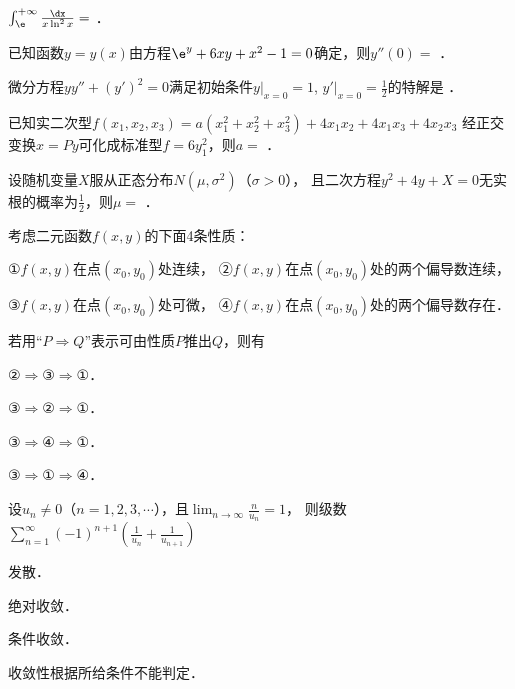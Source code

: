 \documentclass[plain,noanswer,medmath]{../../template/jnuexam}
\begin{document}




\begin{problem}
$\int_{\e}^{+\infty} \frac{\dx}{x\ln^2 x} =$ \fillin{}．
\end{problem}


\begin{problem}
已知函数$y = y(x)$由方程$\e^y + 6xy + x^2 - 1 = 0$确定，则$y''(0) =$ \fillin{}．
\end{problem}


\begin{problem}
微分方程$yy'' + (y')^2 = 0$满足初始条件$y|_{x = 0} = 1$, $y' |_{x = 0} = \frac{1}{2}$的特解是 \fillin{}．
\end{problem}


\begin{problem}
已知实二次型$f(x_1,x_2,x_3) = a(x_1^2 + x_2^2 + x_3^2) + 4x_1x_2 + 4x_1x_3 + 4x_2x_3$
经正交变换$x = Py$可化成标准型$f = 6y_1^2$，则$a =$ \fillin{}．
\end{problem}


\begin{problem}
设随机变量$X$服从正态分布$N(\mu,\sigma^2)$（$\sigma > 0$），
且二次方程$y^2 + 4y + X = 0$无实根的概率为$\frac{1}{2}$，则$\mu =$ \fillin{}．
\end{problem}




\begin{problem}
考虑二元函数$f(x,y)$的下面4条性质：\par
①$f(x,y)$在点$(x_0,y_0)$处连续，	②$f(x,y)$在点$(x_0,y_0)$处的两个偏导数连续，\par
③$f(x,y)$在点$(x_0,y_0)$处可微，	④$f(x,y)$在点$(x_0,y_0)$处的两个偏导数存在．\par
若用``$P \Rightarrow Q$''表示可由性质$P$推出$Q$，则有\pickout{}
\begin{abcd}
\item ②$\Rightarrow$③$\Rightarrow$①．
\item ③$\Rightarrow$②$\Rightarrow$①．
\item ③$\Rightarrow$④$\Rightarrow$①．
\item ③$\Rightarrow$①$\Rightarrow$④．
\end{abcd}
\end{problem}


\begin{problem}
设$u_n \ne 0$（$n = 1,2,3, \cdots$），且$\lim_{n \to \infty} \frac{n}{u_n} = 1$，
则级数$\sum_{n = 1}^{\infty}(- 1)^{n + 1} \left(\frac{1}{u_n} + \frac{1}{u_{n + 1}} \right)$\pickout{}
\begin{abcd}
\item 发散．
\item 绝对收敛．
\item 条件收敛．
\item 收敛性根据所给条件不能判定．
\end{abcd}
\end{problem}
\end{document}
